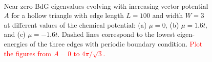 \documentclass[aps,prb,showpacs,amsmath,twocolumn,amssymb,superscriptaddress]{revtex4-2}
\newcommand{\Red}[1]{\textcolor{red}{#1}}
\begin{document}
\begin{figure}[]
  \\
    \;
  \caption{Near-zero BdG eigenvalues evolving with increasing vector potential $A$ for a hollow triangle with edge length $L=100$ and width $W=3$ at different values of the chemical potential: (a) $\mu=0$, (b) $\mu=1.6t$, and (c) $\mu=-1.6t$. Dashed lines correspond to the lowest eigen-energies of the three edges with periodic boundary condition. \Red{Plot the figures from $A=0$ to $4\pi/\sqrt{3}$.}}
  \label{fig: spectral-flows}
\end{figure}
\onecolumngrid
\end{document}
